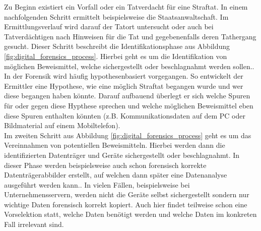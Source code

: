 \noindent
Zu Beginn existiert ein Vorfall oder ein Tatverdacht für eine Straftat. In einem nachfolgenden Schritt ermittelt beispielsweise die Staatsanwaltschaft. Im Ermittlungsverlauf wird darauf der Tatort untersucht oder auch bei Tatverdächtigen nach Hinweisen für die Tat und gegebenenfalls deren Tathergang gesucht. Dieser Schritt beschreibt die Identifikationsphase aus Abbildung \ref{fig:digital_forensics_process}. Hierbei geht es um die Identifikation von möglichen Beweismittel, welche sichergestellt oder  beschlagnahmt werden sollen.\cite[S. 17-24]{digital_forensics}.\\ In der Forensik wird häufig hypothesenbasiert vorgegangen. So entwickelt der Ermittler eine Hypothese, wie eine möglich Straftat begangen wurde und wer diese begangen haben könnte. Darauf aufbauend überlegt er sich welche Spuren für oder gegen diese Hypthese sprechen und welche möglichen Beweismittel eben diese Spuren enthalten könnten (z.B. Kommunikationsdaten auf dem PC oder Bildmaterial auf einem Mobiltelefon).\\

\noindent
Im zweiten Schritt aus Abbildung \ref{fig:digital_forensics_process} geht es um das Vereinnahmen von potentiellen Beweismitteln. Hierbei werden dann die identifizierten Datenträger und Geräte sichergestellt oder beschlagnahmt. In dieser Phase werden beispielsweise auch schon forensisch korrekte Datenträgerabbilder erstellt, auf welchen dann später eine Datenanalyse ausgeführt werden kann.\cite[S. 24-33]{digital_forensics}. In vielen Fällen, beispielsweise bei Unternehmensservern, werden nicht die Geräte selbst sichergestellt sondern nur wichtige Daten forensisch korrekt kopiert. Auch hier findet teilweise schon eine Vorselektion statt, welche Daten benötigt werden und welche Daten im konkreten Fall irrelevant sind.\\

